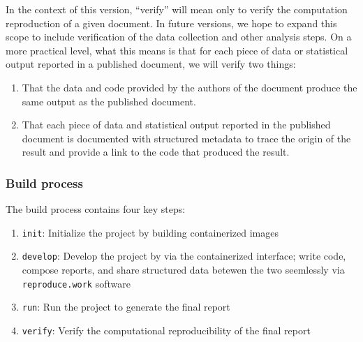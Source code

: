 In the context of this version, ``verify'' will mean only to verify the computation reproduction of a given document. In future versions, we hope to expand this scope to include verification of the data collection and other analysis steps. On a more practical level, what this means is that for each piece of data or statistical output reported in a published document, we will verify two things:

\begin{enumerate}
\itemsep -0.2em
\item That the data and code provided by the authors of the document produce the same output as the published document.
\item That each piece of data and statistical output reported in the published document is documented with structured metadata to trace the origin of the result and provide a link to the code that produced the result.
\end{enumerate}

\hypertarget{build-process}{%
\subsubsection{Build process}\label{build-process}}

The build process contains four key steps: 

\begin{enumerate}
\itemsep -0.2em
\item \texttt{init}: Initialize the project by building containerized images
\item \texttt{develop}: Develop the project by via the containerized interface; write code, compose reports, and share structured data betewen the two seemlessly via \texttt{reproduce.work} software
\item \texttt{run}: Run the project to generate the final report
\item \texttt{verify}: Verify the computational reproducibility of the final report
\end{enumerate}

